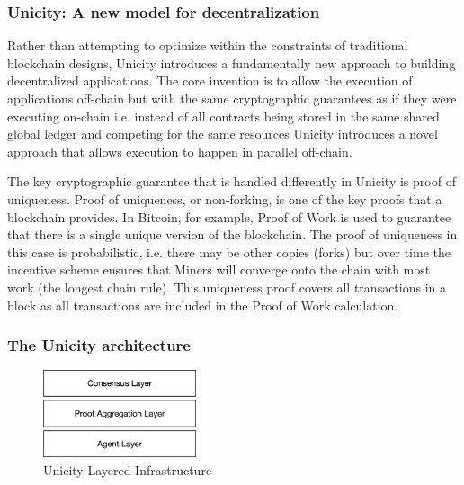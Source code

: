 \documentclass{article}
\begin{document}
\subsubsection{Unicity: A new model for decentralization}

Rather than attempting to optimize within the constraints of traditional blockchain designs, Unicity introduces a fundamentally new approach to building decentralized applications. The core invention is to allow the execution of applications off-chain but with the same cryptographic guarantees as if they were executing on-chain i.e. instead of all contracts being stored in the same shared global ledger and competing for the same resources Unicity introduces a novel approach that allows execution to happen in parallel off-chain.


The key cryptographic guarantee that is handled differently in Unicity is proof of uniqueness. Proof of uniqueness, or non-forking, is one of the key proofs that a blockchain provides. In Bitcoin, for example, Proof of Work is used to guarantee that there is a single unique version of the blockchain. The proof of uniqueness in this case is probabilistic, i.e. there may be other copies (forks) but over time the incentive scheme ensures that Miners will converge onto the chain with most work (the longest chain rule). This uniqueness proof covers all transactions in a block as all transactions are included in the Proof of Work calculation.

\subsubsection{The Unicity architecture}

\begin{figure}[htbp]
    \centering
    \includegraphics[width=0.4\textwidth]{ThreeLayers.png}
    \caption{Unicity Layered Infrastructure}
    \label{fig:layers}
\end{figure}
\end{document}

